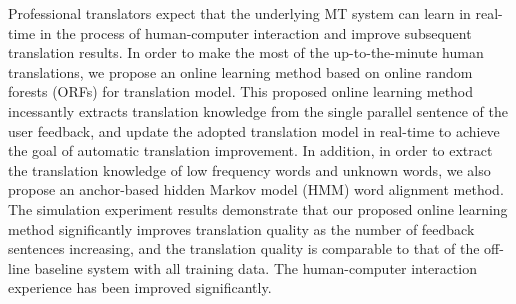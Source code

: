 Professional translators expect that the underlying MT system can learn in real-time in the process of human-computer interaction and improve subsequent translation results. In order to make the most of the up-to-the-minute human translations, we propose an online learning method based on online random forests (ORFs) for translation model. This proposed online learning method incessantly extracts translation knowledge from the single parallel sentence of the user feedback, and update the adopted translation model in real-time to achieve the goal of automatic translation improvement. In addition, in order to extract the translation knowledge of low frequency words and unknown words, we also propose an anchor-based hidden Markov model (HMM) word alignment method. The simulation experiment results demonstrate that our proposed online learning method significantly improves translation quality as the number of feedback sentences increasing, and the translation quality is comparable to that of the off-line baseline system with all training data. The human-computer interaction experience has been improved significantly.

